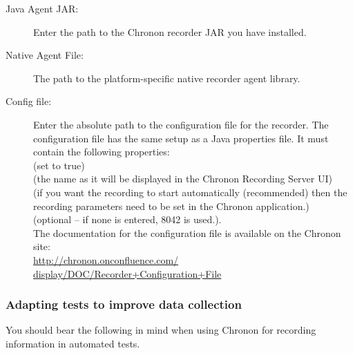 \begin{description}
\item [Java Agent JAR:]{Enter the path to the Chronon recorder JAR you have installed.}
\item [Native Agent File:]{The path to the platform-specific native recorder agent library.}
\item [Config file:]{Enter the absolute path to the configuration file for the recorder. The configuration file has the same setup as a Java properties file. It must contain the following properties:\\
 (set to true)\\
 (the \gdaut{} name as it will be displayed in the Chronon Recording Server UI)\\
 (if you want the recording to start automatically (recommended) then the recording parameters need to be set in the Chronon application.)\\ 
 (optional -- if none is entered, 8042 is used.). \\
The documentation for the configuration file is available on the Chronon site:\\
\href{http://chronon.onconfluence.com/\\
display/DOC/Recorder+Configuration+File}{http://chronon.onconfluence.com/\\
display/DOC/Recorder+Configuration+File}}
\end{description}


\subsubsection{Adapting tests to improve data collection}
You should bear the following in mind when using Chronon for recording information in automated tests.\\

